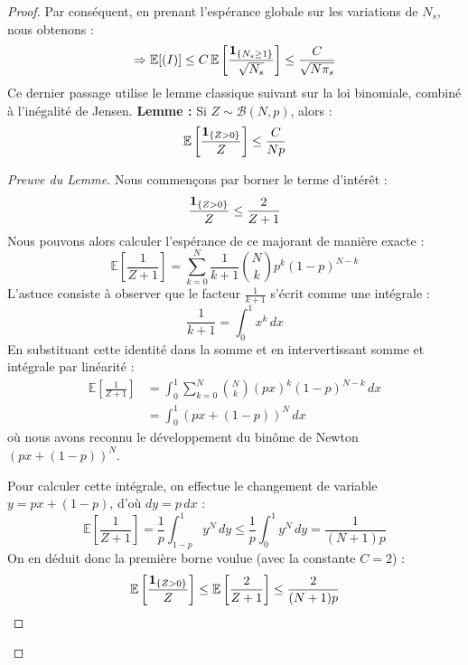 \begin{proof}
    Par conséquent, en prenant l'espérance globale sur les variations de $N_s$, nous obtenons :
    \begin{equation}
        \Rightarrow \mathbb{E}[(I)] \le C \, \mathbb{E}\left[ \frac{\mathbf{1}_{\{N_s \ge 1\}}}{\sqrt{N_s}} \right] \le \frac{C}{\sqrt{N \pi_s}}
    \end{equation}
    Ce dernier passage utilise le lemme classique suivant sur la loi binomiale, combiné à l'inégalité de Jensen.
    \textbf{Lemme :} Si $Z \sim \mathcal{B}(N, p)$, alors :
    \begin{equation*}
        \mathbb{E} \left[ \frac{\mathbf{1}_{\{Z > 0\}}}{Z} \right] \le \frac{C}{N p}
    \end{equation*}

    \begin{proof}[Preuve du Lemme]
        Nous commençons par borner le terme d'intérêt :
        \begin{equation}
            \frac{\mathbf{1}_{\{Z > 0\}}}{Z} \le \frac{2}{Z + 1}
        \end{equation}
        Nous pouvons alors calculer l'espérance de ce majorant de manière exacte :
        \begin{equation}
            \mathbb{E}\left[ \frac{1}{Z + 1} \right] = \sum_{k=0}^N \frac{1}{k+1} \binom{N}{k} p^k (1-p)^{N-k}
        \end{equation}
        L'astuce consiste à observer que le facteur $\frac{1}{k+1}$ s'écrit comme une intégrale :
        \begin{equation*}
            \frac{1}{k+1} = \int_{0}^1 x^k \, dx
        \end{equation*}
        En substituant cette identité dans la somme et en intervertissant somme et intégrale par linéarité :
        \begin{align}
            \mathbb{E}\left[ \frac{1}{Z + 1} \right] &= \int_{0}^1 \sum_{k=0}^N \binom{N}{k} (px)^k (1-p)^{N-k} \, dx \nonumber \\
            &= \int_{0}^1 (px + (1-p))^N \, dx
        \end{align}
        où nous avons reconnu le développement du binôme de Newton $(px + (1-p))^N$.
        
        Pour calculer cette intégrale, on effectue le changement de variable $y = px + (1-p)$, d'où $dy = p \, dx$ :
        \begin{equation}
            \mathbb{E}\left[ \frac{1}{Z + 1} \right] = \frac{1}{p} \int_{1-p}^1 y^N \, dy \le \frac{1}{p} \int_{0}^1 y^N \, dy = \frac{1}{(N+1)p}
        \end{equation}
        On en déduit donc la première borne voulue (avec la constante $C=2$) :
        \begin{equation}
            \mathbb{E} \left[ \frac{\mathbf{1}_{\{Z > 0\}}}{Z} \right] \le \mathbb{E}\left[ \frac{2}{Z + 1} \right] \le \frac{2}{(N+1)p}
        \end{equation}
    \end{proof}
    

\end{proof}
